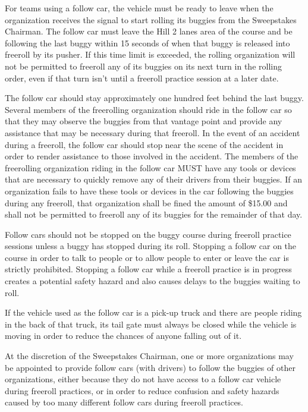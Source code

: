 	For teams using a follow car, the vehicle must be ready to leave when the organization receives the signal to start rolling its buggies from the Sweepstakes Chairman. The follow car must leave the Hill 2 lanes area of the course and be following the last buggy within 15 seconds of when that buggy is released into freeroll by its pusher. If this time limit is exceeded, the rolling organization will not be permitted to freeroll any of its buggies on its next turn in the rolling order, even if that turn isn't until a freeroll practice session at a later date.

	The follow car should stay approximately one hundred feet behind the last buggy. Several members of the freerolling organization should ride in the follow car so that they may observe the buggies from that vantage point and provide any assistance that may be necessary during that freeroll. In the event of an accident during a freeroll, the follow car should stop near the scene of the accident in order to render assistance to those involved in the accident. The members of the freerolling organization riding in the follow car MUST have any tools or devices that are necessary to quickly remove any of their drivers from their buggies. If an organization fails to have these tools or devices in the car following the buggies during any freeroll, that organization shall be fined the amount of \$15.00 and shall not be permitted to freeroll any of its buggies for the remainder of that day.

	Follow cars should not be stopped on the buggy course during freeroll practice sessions unless a buggy has stopped during its roll. Stopping a follow car on the course in order to talk to people or to allow people to enter or leave the car is strictly prohibited. Stopping a follow car while a freeroll practice is in progress creates a potential safety hazard and also causes delays to the buggies waiting to roll.

	If the vehicle used as the follow car is a pick-up truck and there are people riding in the back of that truck, its tail gate must always be closed while the vehicle is moving in order to reduce the chances of anyone falling out of it.

	At the discretion of the Sweepstakes Chairman, one or more organizations may be appointed to provide follow cars (with drivers) to follow the buggies of other organizations, either because they do not have access to a follow car vehicle during freeroll practices, or in order to reduce confusion and safety hazards caused by too many different follow cars during freeroll practices.

